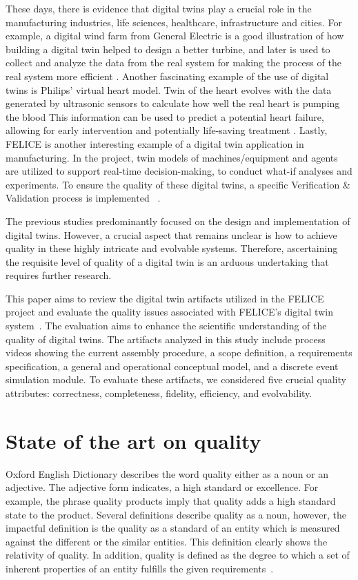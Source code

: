 \documentclass{llncs}
\begin{document}
    
    These days, there is evidence that digital twins play a crucial role in the manufacturing industries, 
    life sciences, healthcare, infrastructure and cities\cite{Review2}.
    For example, a digital wind farm from General Electric is a good illustration of how building a digital twin helped to design a better turbine, 
    and later is used to collect and analyze the data from the real system for making the process of the real system more efficient \cite{GeneralElectricWindTurbine}. 
    Another fascinating example of the use of digital twins is Philips' virtual heart model. Twin of the heart evolves with the  data generated by ultrasonic sensors to calculate 
    how well the real heart is pumping the blood This information can be used to predict a potential heart failure, allowing for early intervention and potentially life-saving treatment \cite{PhilipsHearth}. 
    Lastly, FELICE is another interesting example of a digital twin application in manufacturing. In the project, twin models of machines/equipment and 
    agents are utilized to support real-time decision-making, to conduct what-if analyses and experiments. To ensure the quality of these digital twins, a specific Verification \& Validation process is implemented ~\cite{FELICE}.
    
    The previous studies predominantly focused on the design and implementation of digital twins\cite{Review1, Review2}. 
    However, a crucial aspect that remains unclear is how to achieve quality in these highly intricate and evolvable systems. Therefore, ascertaining the requisite level of quality of a digital twin is an arduous undertaking that requires further research.

    This paper aims to review the digital twin artifacts utilized in the FELICE project and evaluate the quality issues associated with FELICE's digital twin system~\cite{FELICE}. 
    The evaluation aims to enhance the scientific understanding of the quality of digital twins. The artifacts analyzed in this study include process videos showing the current assembly procedure, a scope definition, a requirements specification, a general and operational conceptual model, and a discrete event simulation module. 
    To evaluate these artifacts, we considered five crucial quality attributes: correctness, completeness, fidelity, efficiency, and evolvability.

    \section{State of the art on quality}
    Oxford English Dictionary describes the word quality either as a noun or an adjective. 
    The adjective form indicates, a high standard or excellence. For example, the phrase quality products imply 
    that quality adds a high standard state to the product. Several definitions describe quality 
    as a noun, however, the impactful definition is the quality as a standard of an entity which is measured against the 
    different or the similar entities\cite{OxfordDictionary}. This definition clearly shows the relativity of quality. In addition, quality is defined 
    as the degree to which a set of inherent properties of an entity fulfills the given requirements~\cite{ISO9000}.    
\end{document}
